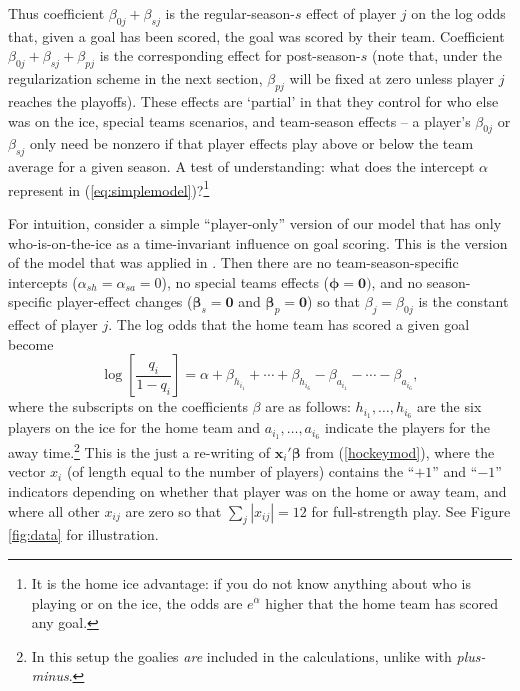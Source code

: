 Thus coefficient
$\beta_{0j} + \beta_{sj}$ is the regular-season-$s$ effect of player $j$ on the log
odds that, given a goal has been scored, the goal was scored by their team.  Coefficient 
$\beta_{0j} + \beta_{sj} + \beta_{pj}$ is the corresponding effect for post-season-$s$ (note that, under the regularization scheme in the next section, $\beta_{pj}$ will be fixed at zero unless player $j$ reaches the playoffs). 
These effects are `partial' in that they control for who else was on the ice,
special teams scenarios, and team-season effects -- a player's
$\beta_{0j}$ or $\beta_{sj}$ only need be nonzero if that player effects play
above or below the team average for a given season.  A test of
understanding: what does the intercept $\alpha$ represent in
(\ref{eq:simplemodel})?\footnote{It is the home ice advantage: if you do not
know anything about who is playing or on the ice, the odds are $e^{\alpha}$
higher that the home team has scored any goal.}


For intuition, consider a simple ``player-only'' version of our model that has
only who-is-on-the-ice as a time-invariant influence on goal scoring.  This is the version of the model that was applied in \cite{gramacy:jensen:taddy:2013}.  Then
there are no team-season-specific intercepts ($\alpha_{sh}=\alpha_{sa}=0$), no
special teams effects ($\boldsymbol{\phi}=\mathbf{0})$, and no season-specific
player-effect changes ($\boldsymbol{\beta}_s = \mathbf{0}$ and $\boldsymbol{\beta}_p = \mathbf{0}$)  so that $\beta_j
= \beta_{0j}$ is the constant effect of player $j$.  The log odds that the
home team has scored a given goal become \begin{equation} \log
\left[\frac{q_i}{1-q_i} \right]  = \alpha + \beta_{h_{i_1}} + \cdots +
\beta_{h_{i_6}} -  \beta_{a_{i_1}} - \cdots - \beta_{a_{i_6}},
\label{eq:simplemodel} \end{equation} where the subscripts on the coefficients
$\beta$ are as follows: $h_{i_1}, \dots, h_{i_6}$ are the six players on the
ice for the home team and  $a_{i_1}, \dots, a_{i_6}$ indicate the players for
the away time.\footnote{In this setup the goalies {\em are} included in the
calculations, unlike with {\em plus-minus}.}  This is the just a re-writing of
$\mathbf{x}_i'\boldsymbol{\beta}$ from (\ref{hockeymod}), where the vector
$x_i$ (of length equal to the number of players) contains the ``$+1$'' and
``$-1$'' indicators depending on whether that player was on the home or away
team, and where all other $x_{ij}$ are zero so that $\sum_j |x_{ij}| = 12$ for
full-strength play. See Figure \ref{fig:data} for illustration. 


